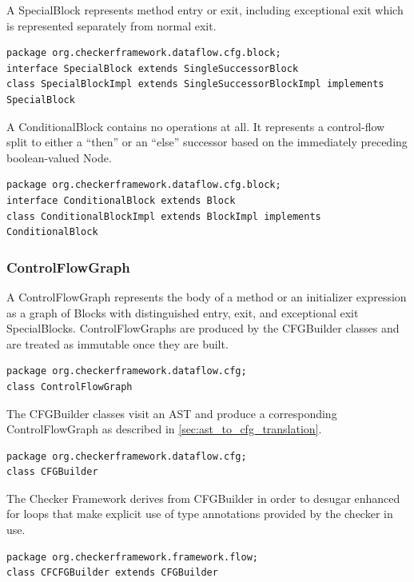 A SpecialBlock represents method entry or exit, including exceptional
exit which is represented separately from normal exit.

\begin{verbatim}
package org.checkerframework.dataflow.cfg.block;
interface SpecialBlock extends SingleSuccessorBlock
class SpecialBlockImpl extends SingleSuccessorBlockImpl implements SpecialBlock
\end{verbatim}

A ConditionalBlock contains no operations at all.  It represents a
control-flow split to either a ``then'' or an ``else'' successor based on
the immediately preceding boolean-valued Node.

\begin{verbatim}
package org.checkerframework.dataflow.cfg.block;
interface ConditionalBlock extends Block
class ConditionalBlockImpl extends BlockImpl implements ConditionalBlock
\end{verbatim}



\subsubsection{ControlFlowGraph}
\label{sec:control_flow_graph_class}

A ControlFlowGraph represents the body of a method or an initializer
expression as a graph of Blocks with distinguished entry, exit, and
exceptional exit SpecialBlocks.  ControlFlowGraphs are produced by the
CFGBuilder classes and are treated as immutable once they are built.

\begin{verbatim}
package org.checkerframework.dataflow.cfg;
class ControlFlowGraph
\end{verbatim}

\label{sec:cfg_builder_classes}

The CFGBuilder classes visit an AST and produce a corresponding
ControlFlowGraph as described in \autoref{sec:ast_to_cfg_translation}.

\begin{verbatim}
package org.checkerframework.dataflow.cfg;
class CFGBuilder
\end{verbatim}

The Checker Framework derives from CFGBuilder in order to desugar
enhanced for loops that make explicit use of type annotations provided
by the checker in use.

\begin{verbatim}
package org.checkerframework.framework.flow;
class CFCFGBuilder extends CFGBuilder
\end{verbatim}


